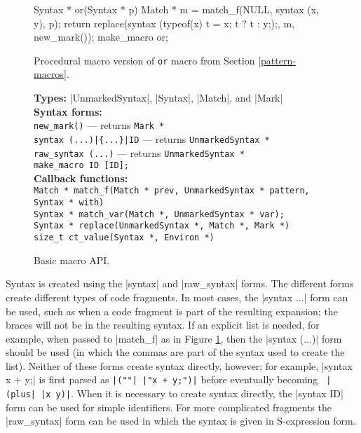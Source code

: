 \begin{figure}
\begin{codef}
Syntax * or(Syntax * p) {
  Match * m = match_f(NULL, syntax (x, y), p);
  return replace(syntax 
                   {({typeof(x) t = x; t ? t : y;});}, 
                 m, new_mark());
}
make_macro or;
\end{codef}
\caption{Procedural macro version of \texttt{or} macro from Section \ref{pattern-macros}.}
\label{proc-example}
\end{figure}

\begin{figure}
\textbf{Types:} |UnmarkedSyntax|, |Syntax|, |Match|, and |Mark| \\

\textbf{Syntax forms:} \\
\hspace*{1em}\verb/new_mark()/ --- returns \verb/Mark */ \\
\hspace*{1em}\verb/syntax (...)|{...}|ID/ --- returns \verb/UnmarkedSyntax */ \\
\hspace*{1em}\verb/raw_syntax (...)/ --- returns \verb/UnmarkedSyntax */ \\
\hspace*{1em}\verb/make_macro ID [ID];/ \\

\textbf{Callback functions:} \\
\hspace*{1em}\verb/Match * match_f(Match * prev, UnmarkedSyntax * pattern, Syntax * with)/\\
\hspace*{1em}\verb/Syntax * match_var(Match *, UnmarkedSyntax * var);/\\
\hspace*{1em}\verb/Syntax * replace(UnmarkedSyntax *, Match *, Mark *)/\\
\hspace*{1em}\verb/size_t ct_value(Syntax *, Environ *)/
\caption{Basic macro API.}
\label{core-macro-abi}
\end{figure}

Syntax is created using the |syntax| and |raw_syntax| forms.  The
different forms create different types of code fragments.  In most
cases, the |syntax {...}| form can be used, such as when a code
fragment is part of the resulting expansion; the braces will not be in
the resulting syntax.  If an explicit list is needed, for example,
when passed to |match_f| as in Figure \ref{proc-example}, then
the |syntax (...)| form should be used (in which the commas are part
of the syntax used to create the list).  Neither of these forms create
syntax directly, however; for example, |syntax {x + y;}| is first
parsed as {\tt |("{}"| |"x + y;")|} before eventually becoming {\tt
  |(plus| |x y)|}.  When it is necessary to create syntax directly,
the |syntax ID| form can be used for simple identifiers.  For more
complicated fragments the |raw_syntax| form can be used in which the
syntax is given in S-expression form.

